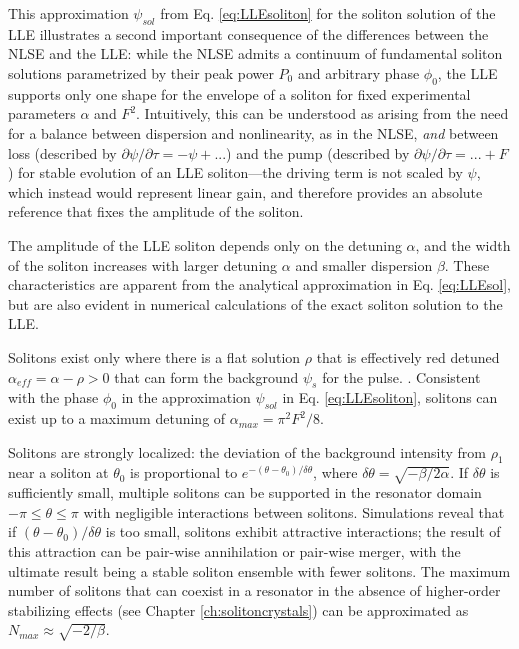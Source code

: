 {This approximation $\psi_{sol}$ from Eq. \ref{eq:LLEsoliton} for the soliton solution of the LLE illustrates a second important consequence of the differences between the NLSE and the LLE: while the NLSE admits a continuum of fundamental soliton solutions parametrized by their peak power $P_0$ and arbitrary phase $\phi_0$, the LLE supports only one shape for the envelope of a soliton for fixed experimental parameters $\alpha$ and $F^2$. Intuitively, this can be understood as arising from the need for a balance between dispersion and nonlinearity, as in the NLSE, \textit{and} between loss (described by $\partial\psi/\partial\tau=-\psi+...$) and the pump (described by $\partial\psi/\partial\tau=...+F$) for stable evolution of an LLE soliton---the driving term is not scaled by $\psi$, which instead would represent linear gain, and therefore provides an absolute reference that fixes the amplitude of the soliton.

The amplitude of the LLE soliton depends only on the detuning $\alpha$, and the width of the soliton increases with larger detuning $\alpha$ and smaller dispersion $\beta$. These characteristics are apparent from the analytical approximation in Eq. \ref{eq:LLEsol}, but are also evident in numerical calculations of the exact soliton solution to the LLE\cite{Yi2015}.

Solitons exist only where there is a flat solution $\rho$ that is effectively red detuned $\alpha_{eff}=\alpha-\rho>0$ that can form the background $\psi_s$ for the pulse\cite{Barashenkov1996,Coen2013}. . Consistent with the phase $\phi_0$ in the approximation $\psi_{sol}$ in Eq. \ref{eq:LLEsoliton}, solitons can exist up to a maximum detuning of $\alpha_{max}=\pi^2 F^2/8$\cite{Herr2014}.


Solitons are strongly localized: the deviation of the background intensity from $\rho_1$ near a soliton at $\theta_0$ is proportional to $e^{-(\theta-\theta_0)/\delta\theta}$, where $\delta\theta=\sqrt{-\beta/2\alpha}$. If $\delta\theta$ is sufficiently small, multiple solitons can be supported in the resonator domain $-\pi\leq\theta\leq\pi$ with negligible interactions between solitons. Simulations reveal that if $(\theta-\theta_0)/\delta\theta$ is too small, solitons exhibit attractive interactions; the result of this attraction can be pair-wise annihilation or pair-wise merger, with the ultimate result being a stable soliton ensemble with fewer solitons. The maximum number of solitons that can coexist in a resonator in the absence of higher-order stabilizing effects (see Chapter \ref{ch:solitoncrystals}) can be approximated as $N_{max}\approx\sqrt{-2/\beta}$.

}

